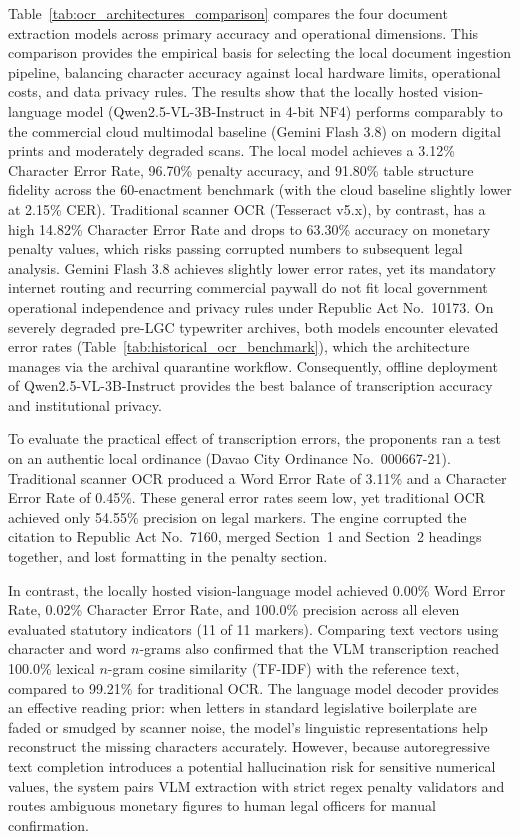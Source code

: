 Table~\ref{tab:ocr_architectures_comparison} compares the four document extraction models across primary accuracy and operational dimensions. This comparison provides the empirical basis for selecting the local document ingestion pipeline, balancing character accuracy against local hardware limits, operational costs, and data privacy rules. The results show that the locally hosted vision-language model (Qwen2.5-VL-3B-Instruct in 4-bit NF4) performs comparably to the commercial cloud multimodal baseline (Gemini Flash 3.8) on modern digital prints and moderately degraded scans. The local model achieves a 3.12\% Character Error Rate, 96.70\% penalty accuracy, and 91.80\% table structure fidelity across the 60-enactment benchmark (with the cloud baseline slightly lower at 2.15\% CER). Traditional scanner OCR (Tesseract v5.x), by contrast, has a high 14.82\% Character Error Rate and drops to 63.30\% accuracy on monetary penalty values, which risks passing corrupted numbers to subsequent legal analysis. Gemini Flash 3.8 achieves slightly lower error rates, yet its mandatory internet routing and recurring commercial paywall do not fit local government operational independence and privacy rules under Republic Act No.~10173. On severely degraded pre-LGC typewriter archives, both models encounter elevated error rates (Table~\ref{tab:historical_ocr_benchmark}), which the architecture manages via the archival quarantine workflow. Consequently, offline deployment of Qwen2.5-VL-3B-Instruct provides the best balance of transcription accuracy and institutional privacy.

To evaluate the practical effect of transcription errors, the proponents ran a test on an authentic local ordinance (Davao City Ordinance No.~000667-21). Traditional scanner OCR produced a Word Error Rate of 3.11\% and a Character Error Rate of 0.45\%. These general error rates seem low, yet traditional OCR achieved only 54.55\% precision on legal markers. The engine corrupted the citation to Republic Act No.~7160, merged Section~1 and Section~2 headings together, and lost formatting in the penalty section.

In contrast, the locally hosted vision-language model achieved 0.00\% Word Error Rate, 0.02\% Character Error Rate, and 100.0\% precision across all eleven evaluated statutory indicators (11 of 11 markers). Comparing text vectors using character and word $n$-grams also confirmed that the VLM transcription reached 100.0\% lexical $n$-gram cosine similarity (TF-IDF) with the reference text, compared to 99.21\% for traditional OCR. The language model decoder provides an effective reading prior: when letters in standard legislative boilerplate are faded or smudged by scanner noise, the model's linguistic representations help reconstruct the missing characters accurately. However, because autoregressive text completion introduces a potential hallucination risk for sensitive numerical values, the system pairs VLM extraction with strict regex penalty validators and routes ambiguous monetary figures to human legal officers for manual confirmation.


